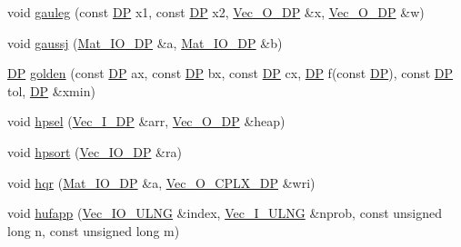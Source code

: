 \begin{DoxyCompactItemize}
\item 
void \mbox{\hyperlink{namespaceNR_a722933d3ddfd7e76e9533892768ae542}{gauleg}} (const \mbox{\hyperlink{namespaceNR_af6ff762dd605ff477b8e52387253a02a}{DP}} x1, const \mbox{\hyperlink{namespaceNR_af6ff762dd605ff477b8e52387253a02a}{DP}} x2, \mbox{\hyperlink{namespaceNR_a970094d23441f8ef6a45282a7eb2103d}{Vec\+\_\+\+O\+\_\+\+DP}} \&x, \mbox{\hyperlink{namespaceNR_a970094d23441f8ef6a45282a7eb2103d}{Vec\+\_\+\+O\+\_\+\+DP}} \&w)
\item 
void \mbox{\hyperlink{namespaceNR_a1d6883edf9183e4e0a4b6be01655b057}{gaussj}} (\mbox{\hyperlink{namespaceNR_ad1513aa4697878ed3bff0b8b3c9dd910}{Mat\+\_\+\+I\+O\+\_\+\+DP}} \&a, \mbox{\hyperlink{namespaceNR_ad1513aa4697878ed3bff0b8b3c9dd910}{Mat\+\_\+\+I\+O\+\_\+\+DP}} \&b)
\item 
\mbox{\hyperlink{namespaceNR_af6ff762dd605ff477b8e52387253a02a}{DP}} \mbox{\hyperlink{namespaceNR_a0fb02a1e4932c1918d2a75bdcfec27cd}{golden}} (const \mbox{\hyperlink{namespaceNR_af6ff762dd605ff477b8e52387253a02a}{DP}} ax, const \mbox{\hyperlink{namespaceNR_af6ff762dd605ff477b8e52387253a02a}{DP}} bx, const \mbox{\hyperlink{namespaceNR_af6ff762dd605ff477b8e52387253a02a}{DP}} cx, \mbox{\hyperlink{namespaceNR_af6ff762dd605ff477b8e52387253a02a}{DP}} f(const \mbox{\hyperlink{namespaceNR_af6ff762dd605ff477b8e52387253a02a}{DP}}), const \mbox{\hyperlink{namespaceNR_af6ff762dd605ff477b8e52387253a02a}{DP}} tol, \mbox{\hyperlink{namespaceNR_af6ff762dd605ff477b8e52387253a02a}{DP}} \&xmin)
\item 
void \mbox{\hyperlink{namespaceNR_a5eaa00a5151ec180e13b5fd8824fd161}{hpsel}} (\mbox{\hyperlink{namespaceNR_a9f943da53862537c552e2a770cb170ae}{Vec\+\_\+\+I\+\_\+\+DP}} \&arr, \mbox{\hyperlink{namespaceNR_a970094d23441f8ef6a45282a7eb2103d}{Vec\+\_\+\+O\+\_\+\+DP}} \&heap)
\item 
void \mbox{\hyperlink{namespaceNR_a2d78b1ffd173d958219ab98bbcdcd3c4}{hpsort}} (\mbox{\hyperlink{namespaceNR_ab293e06a6bf799d8a7ed932b6852bcb8}{Vec\+\_\+\+I\+O\+\_\+\+DP}} \&ra)
\item 
void \mbox{\hyperlink{namespaceNR_a78db7534f0991399c7f0d4a618175da7}{hqr}} (\mbox{\hyperlink{namespaceNR_ad1513aa4697878ed3bff0b8b3c9dd910}{Mat\+\_\+\+I\+O\+\_\+\+DP}} \&a, \mbox{\hyperlink{namespaceNR_ace78d6fd6a189eda11ef1f1ec73692d9}{Vec\+\_\+\+O\+\_\+\+C\+P\+L\+X\+\_\+\+DP}} \&wri)
\item 
void \mbox{\hyperlink{namespaceNR_a55c1e21a90e38a4569ab763ec0a94515}{hufapp}} (\mbox{\hyperlink{namespaceNR_a3b5de5b305729eeca6289dfee2a39229}{Vec\+\_\+\+I\+O\+\_\+\+U\+L\+NG}} \&index, \mbox{\hyperlink{namespaceNR_a117570729decc729db86f7655e7a23e5}{Vec\+\_\+\+I\+\_\+\+U\+L\+NG}} \&nprob, const unsigned long n, const unsigned long m)

\end{DoxyCompactItemize}
